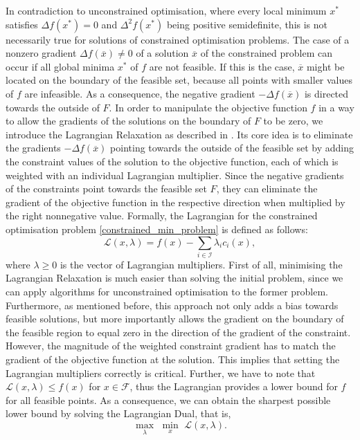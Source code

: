 \indent In contradiction to unconstrained optimisation, where every local minimum $x^*$ satisfies $\Delta f(x^*) = 0$ and $\Delta^2 f(x^*)$ being positive semidefinite, this is not necessarily true for solutions of constrained optimisation problems. The case of a nonzero gradient ${\Delta f(\overline{x}) \neq 0}$ of a solution $\overline{x}$ of the constrained problem can occur if all global minima $x^*$ of $f$ are not feasible. If this is the case, $\overline{x}$ might be located on the boundary of the feasible set, because all points with smaller values of $f$ are infeasible. As a consequence, the negative gradient $-\Delta f(\overline{x})$ is directed towards the outside of $F$. In order to manipulate the objective function $f$ in a way to allow the gradients of the solutions on the boundary of $F$ to be zero, we introduce the Lagrangian Relaxation as described in \cite{NoceWrig06}. Its core idea is to eliminate the gradients $-\Delta f(\overline{x})$ pointing towards the outside of the feasible set by adding the constraint values of the solution to the objective function, each of which is weighted with an individual Lagrangian multiplier. Since the negative gradients of the constraints point towards the feasible set $F$, they can eliminate the gradient of the objective function in the respective direction when multiplied by the right nonnegative value. Formally, the Lagrangian for the constrained optimisation problem \eqref{constrained_min_problem} is defined as follows:
\[ \mathcal{L}(x, \lambda) = f(x) - \sum_{i \in \mathcal{I}} \lambda_i c_i(x), \]
where $\lambda \geq 0$ is the vector of Lagrangian multipliers. First of all, minimising the Lagrangian Relaxation is much easier than solving the initial problem, since we can apply algorithms for unconstrained optimisation to the former problem. Furthermore, as mentioned before, this approach not only adds a bias towards feasible solutions, but more importantly allows the gradient on the boundary of the feasible region to equal zero in the direction of the gradient of the constraint. However, the magnitude of the weighted constraint gradient has to match the gradient of the objective function at the solution. This implies that setting the Lagrangian multipliers correctly is critical. Further, we have to note that $\mathcal{L}(x, \lambda) \leq f(x)$ for $x \in \mathcal{F}$, thus the Lagrangian provides a lower bound for $f$ for all feasible points. As a consequence, we can obtain the sharpest possible lower bound by solving the Lagrangian Dual, that is, 
\[ \underset{\lambda}{\max}\,\, \underset{x}{\min}\,\, \mathcal{L}(x, \lambda). \]
